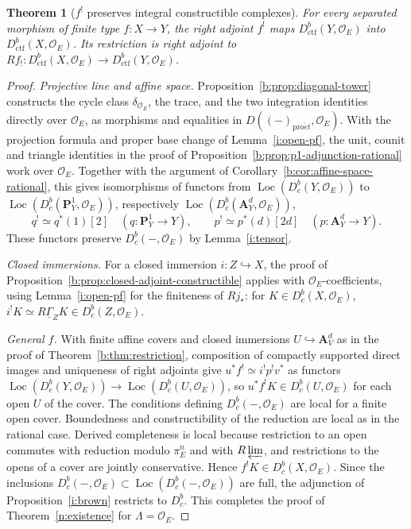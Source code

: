 \documentclass[11pt,a4paper]{article}
\numberwithin{equation}{section}
\newtheorem{theorem}{Theorem}[section]
\theoremstyle{definition}
\theoremstyle{remark}
\newcommand{\Dbc}{D^b_c}
\newcommand{\Loc}{\operatorname{Loc}}
\newcommand{\proet}{\mathrm{pro}\acute{e}t}
\newcommand{\Dctf}{D^b_{\mathrm{ctf}}}
\begin{document}
\begin{theorem}[$f^!$ preserves integral constructible complexes]
\label{i:restriction}
For every separated morphism of finite type $f:X\to Y$, the
right adjoint $f^!$ maps $\Dctf(Y,\mathcal O_E)$ into
$\Dctf(X,\mathcal O_E)$. Its restriction is right adjoint to
$Rf_!:\Dctf(X,\mathcal O_E)\to\Dctf(Y,\mathcal O_E)$.
\end{theorem}
\begin{proof}
\emph{Projective line and affine space.}
Proposition~\ref{b:prop:diagonal-tower} constructs the cycle class
$\delta_{\mathcal O_E}$, the trace, and the two integration identities
directly over $\mathcal O_E$, as morphisms and equalities in
$D((-)_{\proet},\mathcal O_E)$. With the projection formula and proper base change of Lemma~\ref{i:open-pf}, the
unit, counit and triangle identities in the proof of
Proposition~\ref{b:prop:p1-adjunction-rational} work over $\mathcal O_E$.
Together with the argument of Corollary~\ref{b:cor:affine-space-rational},
this gives isomorphisms of functors from $\Loc(\Dbc(Y,\mathcal O_E))$ to
$\Loc(\Dbc(\mathbf P^1_Y,\mathcal O_E))$, respectively
$\Loc(\Dbc(\mathbf A^d_Y,\mathcal O_E))$,
\[
 q^!\simeq q^*(1)[2]\quad(q:\mathbf P^1_Y\to Y),\qquad
 p^!\simeq p^*(d)[2d]\quad(p:\mathbf A^d_Y\to Y).
\]
These functors preserve $\Dbc(-,\mathcal O_E)$ by Lemma~\ref{i:tensor}.

\emph{Closed immersions.} For a closed immersion $i:Z\hookrightarrow X$,
the proof of Proposition~\ref{b:prop:closed-adjoint-constructible}
applies with $\mathcal O_E$-coefficients, using Lemma~\ref{i:open-pf} for
the finiteness of $Rj_*$: for $K\in\Dbc(X,\mathcal O_E)$,
$i^!K\simeq R\underline\Gamma_ZK\in\Dbc(Z,\mathcal O_E)$.

\emph{General $f$.} With finite affine covers and closed immersions
$U\hookrightarrow\mathbf A^d_V$ as in the proof of
Theorem~\ref{b:thm:restriction}, composition of compactly supported direct
images and uniqueness of right adjoints give $u^*f^!\simeq i^!p^!v^*$ as functors
$\Loc(\Dbc(Y,\mathcal O_E))\to\Loc(\Dbc(U,\mathcal O_E))$,
so $u^*f^!K\in\Dbc(U,\mathcal O_E)$ for each open $U$ of the cover. The
conditions defining $\Dbc(-,\mathcal O_E)$ are local for a finite open
cover. Boundedness and constructibility of the reduction are local as in
the rational case. Derived completeness is local because restriction to
an open commutes with reduction modulo $\pi_E^n$ and with $R\varprojlim$,
and restrictions to the opens of a cover are jointly conservative. Hence
$f^!K\in\Dbc(X,\mathcal O_E)$. Since the inclusions
$\Dbc(-,\mathcal O_E)\subset\Loc(\Dbc(-,\mathcal O_E))$ are full, the
adjunction of Proposition~\ref{i:brown} restricts to $\Dbc$. This
completes the proof of Theorem~\ref{n:existence} for $\Lambda=\mathcal O_E$.
\end{proof}
\end{document}
